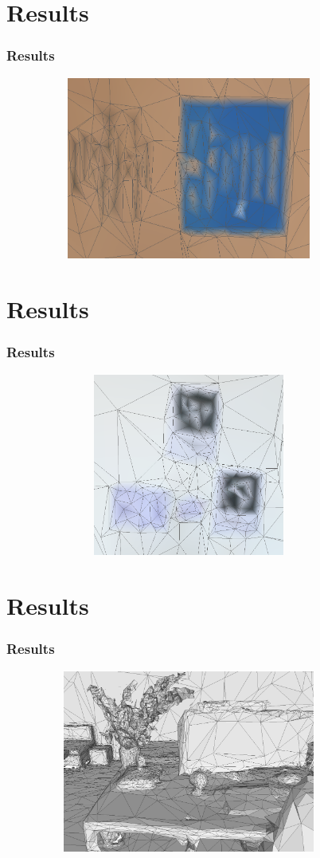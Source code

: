 \documentclass[
	10pt,
	t		%
]{beamer}
\begin{document}
\section{Results}
\begin{frame}
\frametitle{Results}
\centering
\begin{figure}[ht]
\centering
\includegraphics[width=10cm,height=6cm]{color_3}
\end{figure}
\end{frame}

\section{Results}
\begin{frame}
\frametitle{Results}
\centering
\begin{figure}[ht]
\centering
\includegraphics[width=10cm,height=6cm]{color_6}
\end{figure}
\end{frame}

\section{Results}
\begin{frame}
\frametitle{Results}
\centering
\begin{figure}[ht]
\centering
\includegraphics[width=10cm,height=6cm]{desk}
\end{figure}
\end{frame}
\end{document}
